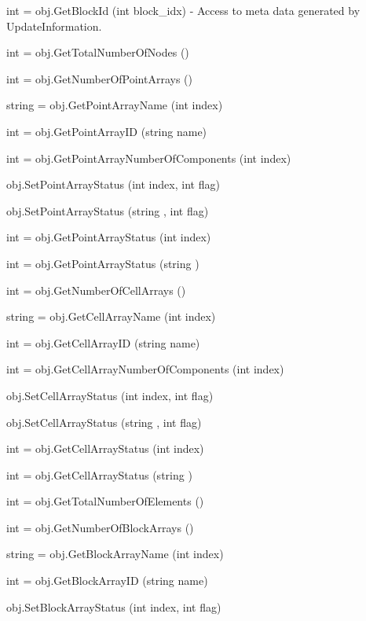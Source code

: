 \begin{DoxyItemize}
\item {\ttfamily int = obj.\-Get\-Block\-Id (int block\-\_\-idx)} -\/ Access to meta data generated by Update\-Information.  
\item {\ttfamily int = obj.\-Get\-Total\-Number\-Of\-Nodes ()}  
\item {\ttfamily int = obj.\-Get\-Number\-Of\-Point\-Arrays ()}  
\item {\ttfamily string = obj.\-Get\-Point\-Array\-Name (int index)}  
\item {\ttfamily int = obj.\-Get\-Point\-Array\-I\-D (string name)}  
\item {\ttfamily int = obj.\-Get\-Point\-Array\-Number\-Of\-Components (int index)}  
\item {\ttfamily obj.\-Set\-Point\-Array\-Status (int index, int flag)}  
\item {\ttfamily obj.\-Set\-Point\-Array\-Status (string , int flag)}  
\item {\ttfamily int = obj.\-Get\-Point\-Array\-Status (int index)}  
\item {\ttfamily int = obj.\-Get\-Point\-Array\-Status (string )}  
\item {\ttfamily int = obj.\-Get\-Number\-Of\-Cell\-Arrays ()}  
\item {\ttfamily string = obj.\-Get\-Cell\-Array\-Name (int index)}  
\item {\ttfamily int = obj.\-Get\-Cell\-Array\-I\-D (string name)}  
\item {\ttfamily int = obj.\-Get\-Cell\-Array\-Number\-Of\-Components (int index)}  
\item {\ttfamily obj.\-Set\-Cell\-Array\-Status (int index, int flag)}  
\item {\ttfamily obj.\-Set\-Cell\-Array\-Status (string , int flag)}  
\item {\ttfamily int = obj.\-Get\-Cell\-Array\-Status (int index)}  
\item {\ttfamily int = obj.\-Get\-Cell\-Array\-Status (string )}  
\item {\ttfamily int = obj.\-Get\-Total\-Number\-Of\-Elements ()}  
\item {\ttfamily int = obj.\-Get\-Number\-Of\-Block\-Arrays ()}  
\item {\ttfamily string = obj.\-Get\-Block\-Array\-Name (int index)}  
\item {\ttfamily int = obj.\-Get\-Block\-Array\-I\-D (string name)}  
\item {\ttfamily obj.\-Set\-Block\-Array\-Status (int index, int flag)}  

\end{DoxyItemize}
